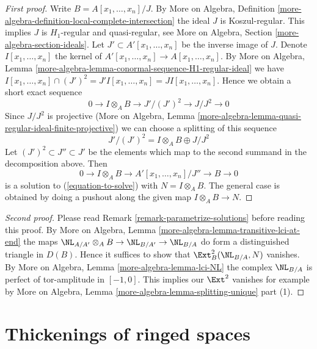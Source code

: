 \begin{proof}[First proof]
Write $B = A[x_1, \ldots, x_n]/J$. By More on Algebra, Definition
\ref{more-algebra-definition-local-complete-intersection}
the ideal $J$ is Koszul-regular. This implies $J$ is $H_1$-regular and
quasi-regular, see More on Algebra, Section \ref{more-algebra-section-ideals}.
Let $J' \subset A'[x_1, \ldots, x_n]$
be the inverse image of $J$. Denote $I[x_1, \ldots, x_n]$ the
kernel of $A'[x_1, \ldots, x_n] \to A[x_1, \ldots, x_n]$.
By More on Algebra, Lemma
\ref{more-algebra-lemma-conormal-sequence-H1-regular-ideal} we have
$I[x_1, \ldots, x_n] \cap (J')^2 = J'I[x_1, \ldots, x_n] =
JI[x_1, \ldots, x_n]$. Hence we obtain a short exact sequence
$$
0 \to I \otimes_A B \to J'/(J')^2 \to J/J^2 \to 0
$$
Since $J/J^2$ is projective (More on Algebra, Lemma
\ref{more-algebra-lemma-quasi-regular-ideal-finite-projective})
we can choose a splitting of this sequence
$$
J'/(J')^2 = I \otimes_A B \oplus J/J^2 
$$
Let $(J')^2 \subset J'' \subset J'$ be the elements which map to the
second summand in the decomposition above. Then
$$
0 \to I \otimes_A B \to A'[x_1, \ldots, x_n]/J'' \to B \to 0
$$
is a solution to (\ref{equation-to-solve}) with $N = I \otimes_A B$.
The general case is obtained by doing a pushout along the given
map $I \otimes_A B \to N$.
\end{proof}

\begin{proof}[Second proof]
Please read Remark \ref{remark-parametrize-solutions}
before reading this proof. By
More on Algebra, Lemma \ref{more-algebra-lemma-transitive-lci-at-end}
the maps $\NL_{A/A'} \otimes_A B \to \NL_{B/A'} \to \NL_{B/A}$
do form a distinguished triangle in $D(B)$.
Hence it suffices to show that $\Ext^2_B(\NL_{B/A}, N)$ vanishes.
By More on Algebra, Lemma \ref{more-algebra-lemma-lci-NL}
the complex $\NL_{B/A}$ is perfect of tor-amplitude in
$[-1, 0]$. This implies our $\Ext^2$ vanishes for example
by More on Algebra, Lemma \ref{more-algebra-lemma-splitting-unique} part (1).
\end{proof}







\section{Thickenings of ringed spaces}
\label{section-thickenings-spaces}

